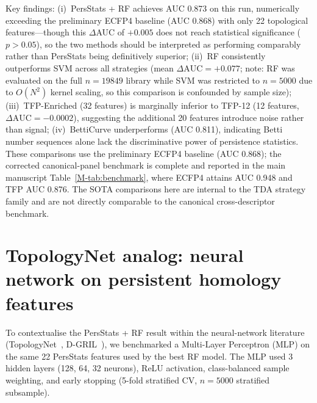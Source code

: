 \documentclass[11pt,a4paper]{article}
\begin{document}
Key findings: (i)~PersStats + RF achieves AUC \num{0.873} on this run, numerically exceeding the preliminary ECFP4 baseline (AUC \num{0.868}) with only 22 topological features---though this $\Delta$AUC of $+\num{0.005}$ does not reach statistical significance ($p > \num{0.05}$), so the two methods should be interpreted as performing comparably rather than PersStats being definitively superior; (ii)~RF consistently outperforms SVM across all strategies (mean $\Delta\text{AUC} = +\num{0.077}$; note: RF was evaluated on the full $n = \num{19849}$ library while SVM was restricted to $n = \num{5000}$ due to $O(N^2)$ kernel scaling, so this comparison is confounded by sample size); (iii)~TFP-Enriched (32 features) is marginally inferior to TFP-12 (12 features, $\Delta\text{AUC} = -\num{0.0002}$), suggesting the additional 20 features introduce noise rather than signal; (iv)~BettiCurve underperforms (AUC \num{0.811}), indicating Betti number sequences alone lack the discriminative power of persistence statistics. These comparisons use the preliminary ECFP4 baseline (AUC \num{0.868}); the corrected canonical-panel benchmark is complete and reported in the main manuscript Table~\cref{M-tab:benchmark}, where ECFP4 attains AUC \num{0.948} and TFP AUC \num{0.876}. The SOTA comparisons here are internal to the TDA strategy family and are not directly comparable to the canonical cross-descriptor benchmark.


\section{TopologyNet analog: neural network on persistent homology features}
\label{sec:topologynet_analog}

To contextualise the PersStats + RF result within the neural-network literature (TopologyNet~\citep{topologynet_2018}, D-GRIL~\citep{dgril_2026}), we benchmarked a Multi-Layer Perceptron (MLP) on the same 22 PersStats features used by the best RF model. The MLP used 3 hidden layers (128, 64, 32 neurons), ReLU activation, class-balanced sample weighting, and early stopping (5-fold stratified CV, $n = \num{5000}$ stratified subsample).
\end{document}
